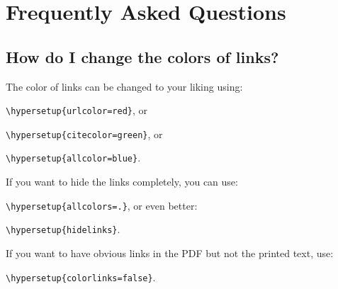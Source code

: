 
\chapter{Frequently Asked Questions} %

\label{AppendixA} %

\section{How do I change the colors of links?}

The color of links can be changed to your liking using:

{\small\verb!\hypersetup{urlcolor=red}!}, or

{\small\verb!\hypersetup{citecolor=green}!}, or

{\small\verb!\hypersetup{allcolor=blue}!}.

\noindent If you want to hide the links completely, you can use:

{\small\verb!\hypersetup{allcolors=.}!}, or even better: 

{\small\verb!\hypersetup{hidelinks}!}.

\noindent If you want to have obvious links in the PDF but not the printed text, use:

{\small\verb!\hypersetup{colorlinks=false}!}.
